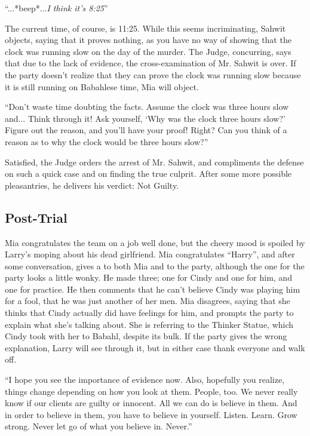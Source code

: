 \begin{center}
``...*beep*...\textit{I think it's 8:25}''
\end{center}
The current time, of course, is 11:25. While this seems incriminating, Sahwit objects, saying that it proves nothing, as you have no way of showing that the clock was running slow on the day of the murder. The Judge, concurring, says that due to the lack of evidence, the cross-examination of Mr. Sahwit is over. If the party doesn't realize that they can prove the clock was running slow because it is still running on Babahlese time, Mia will object.
\begin{center}
``Don't waste time doubting the facts. Assume the clock was three hours slow and... Think through it! Ask yourself, `Why was the clock three hours slow?' Figure out the reason, and you'll have your proof! Right? Can you think of a reason as to why the clock would be three hours slow?''\end{center}
Satisfied, the Judge orders the arrest of Mr. Sahwit, and compliments the defense on such a quick case and on finding the true culprit. After some more possible pleasantries, he delivers his verdict: Not Guilty. 

\subsection{Post-Trial}

Mia congratulates the team on a job well done, but the cheery mood is spoiled by Larry's moping about his dead girlfriend. Mia congratulates ``Harry'', and after some conversation, gives a  to both Mia and to the party, although the one for the party looks a little wonky. He made three; one for Cindy and one for him, and one for practice. He then comments that he can't believe Cindy was playing him for a fool, that he was just another of her men. Mia disagrees, saying that she thinks that Cindy actually did have feelings for him, and prompts the party to explain what she's talking about. She is referring to the Thinker Statue, which Cindy took with her to Babahl, despite its bulk. If the party gives the wrong explanation, Larry will see through it, but in either case thank everyone and walk off. 

\begin{center}
``I hope you see the importance of evidence now. Also, hopefully you realize, things change depending on how you look at them. People, too. We never really know if our clients are guilty or innocent. All we can do is believe in them. And in order to believe in them, you have to believe in yourself. Listen. Learn. Grow strong. Never let go of what you believe in. Never.''\end{center}


